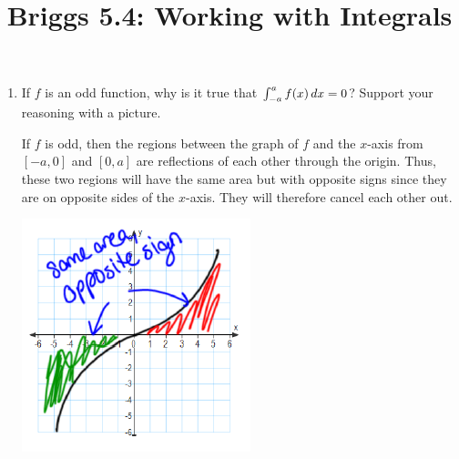 \documentclass[nooutcomes]{ximera}
\title{Briggs 5.4: Working with Integrals}
\begin{document}
\begin{abstract}
\end{abstract}
\maketitle


\begin{problem}

  \begin{enumerate}
    \item
    If $f$ is an odd function, why is it true that $\int_{-a}^a f(x)
    \,d x = 0$?  
    Support your reasoning with a picture.
    \begin{freeResponse}
      If $f$ is odd, then the regions between the graph of $f$ and the $x$-axis from $[-a,0]$ and $[0,a]$ are reflections of each other through the origin.
      Thus, these two regions will have the same area but with opposite signs since they are on opposite sides of the $x$-axis.
      They will therefore cancel each other out.
		
      \begin{image}
        \includegraphics[scale=.7]{Images/Figure1.png}
      \end{image}
    \end{freeResponse}
		

\end{enumerate}
\end{problem}
\end{document}
